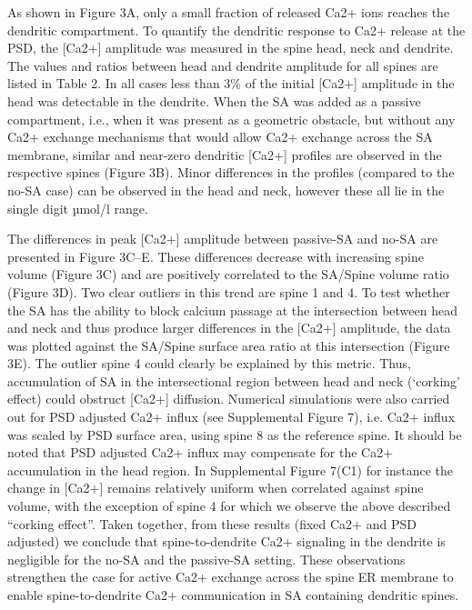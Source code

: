 \documentclass[fleqn,10pt]{wlscirep}
\begin{document}
As shown in Figure 3A, only a small fraction of released Ca2+ ions reaches the dendritic compartment. To quantify the dendritic response to Ca2+ release at the PSD, the [Ca2+] amplitude was measured in the spine head, neck and dendrite. The values and ratios between head and dendrite amplitude for all spines are listed in Table 2. In all cases less than 3\% of the initial [Ca2+] amplitude in the head was detectable in the dendrite. When the SA was added as a passive compartment, i.e., when it was present as a geometric obstacle, but without any Ca2+ exchange mechanisms that would allow Ca2+ exchange across the SA membrane, similar and near-zero dendritic [Ca2+] profiles are observed in the respective spines (Figure 3B). Minor differences in the profiles (compared to the no-SA case) can be observed in the head and neck, however these all lie in the single digit µmol/l range.

The differences in peak [Ca2+] amplitude between passive-SA and no-SA are presented in Figure 3C–E. These differences decrease with increasing spine volume (Figure 3C) and are positively correlated to the SA/Spine volume ratio (Figure 3D). Two clear outliers in this trend are spine 1 and 4. To test whether the SA has the ability to block calcium passage at the intersection between head and neck and thus produce larger differences in the [Ca2+] amplitude, the data was plotted against the SA/Spine surface area ratio at this intersection (Figure 3E). The outlier spine 4 could clearly be explained by this metric. Thus, accumulation of SA in the intersectional region between head and neck (‘corking’ effect) could obstruct [Ca2+] diffusion. Numerical simulations were also carried out for PSD adjusted Ca2+ influx (see Supplemental Figure 7), i.e. Ca2+  influx was scaled by PSD surface area, using spine 8 as the reference spine. It should be noted that PSD adjusted Ca2+ influx may compensate for the Ca2+ accumulation in the head region. In Supplemental Figure 7(C1) for instance the change in [Ca2+] remains relatively uniform when correlated against spine volume, with the exception of spine 4 for which we observe the above described “corking effect”. Taken together, from these results (fixed Ca2+ and PSD adjusted) we conclude that spine-to-dendrite Ca2+ signaling in the dendrite is negligible for the no-SA and the passive-SA setting. These observations strengthen the case for active Ca2+ exchange across the spine ER membrane to enable spine-to-dendrite Ca2+ communication in SA containing dendritic spines.
\end{document}
